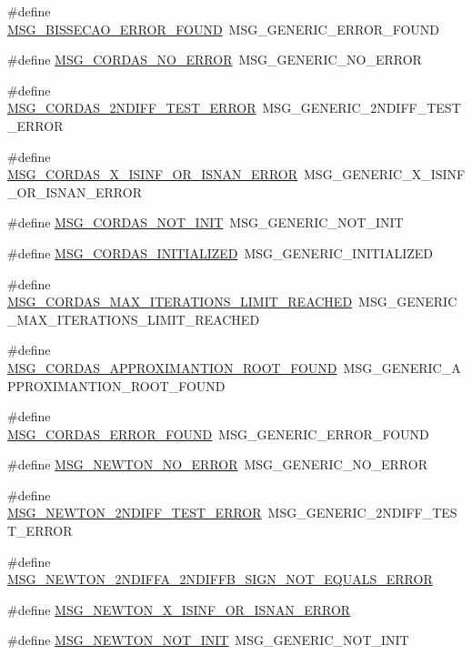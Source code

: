 \begin{CompactItemize}
\item 
\#define \hyperlink{group____messages_g045864209c190bf6517acac3482a4eeb}{MSG\_\-BISSECAO\_\-ERROR\_\-FOUND}~MSG\_\-GENERIC\_\-ERROR\_\-FOUND
\item 
\#define \hyperlink{group____messages_ge43ef9f2448a816d8f5a66a10be9ecc6}{MSG\_\-CORDAS\_\-NO\_\-ERROR}~MSG\_\-GENERIC\_\-NO\_\-ERROR
\item 
\#define \hyperlink{group____messages_g5c53fb596fa16a011c11b5f774fc734c}{MSG\_\-CORDAS\_\-2NDIFF\_\-TEST\_\-ERROR}~MSG\_\-GENERIC\_\-2NDIFF\_\-TEST\_\-ERROR
\item 
\#define \hyperlink{group____messages_g3833ee2af65442ebe52a0b8894d0ffba}{MSG\_\-CORDAS\_\-X\_\-ISINF\_\-OR\_\-ISNAN\_\-ERROR}~MSG\_\-GENERIC\_\-X\_\-ISINF\_\-OR\_\-ISNAN\_\-ERROR
\item 
\#define \hyperlink{group____messages_gaad95696ca51302bb4eeda73e504af28}{MSG\_\-CORDAS\_\-NOT\_\-INIT}~MSG\_\-GENERIC\_\-NOT\_\-INIT
\item 
\#define \hyperlink{group____messages_g65513cb1fdadbdf469b3e7ebfd3368fd}{MSG\_\-CORDAS\_\-INITIALIZED}~MSG\_\-GENERIC\_\-INITIALIZED
\item 
\#define \hyperlink{group____messages_gbf2eaacf66da6f1a3ff81d41a6d494ea}{MSG\_\-CORDAS\_\-MAX\_\-ITERATIONS\_\-LIMIT\_\-REACHED}~MSG\_\-GENERIC\_\-MAX\_\-ITERATIONS\_\-LIMIT\_\-REACHED
\item 
\#define \hyperlink{group____messages_g3ec8f3193397bc6bd52fa50ee40e4768}{MSG\_\-CORDAS\_\-APPROXIMANTION\_\-ROOT\_\-FOUND}~MSG\_\-GENERIC\_\-APPROXIMANTION\_\-ROOT\_\-FOUND
\item 
\#define \hyperlink{group____messages_gdceb3235c5e378df5e9204c5bd9802b9}{MSG\_\-CORDAS\_\-ERROR\_\-FOUND}~MSG\_\-GENERIC\_\-ERROR\_\-FOUND
\item 
\#define \hyperlink{group____messages_g40705a83db640354a9ed6bdd2ae0d83b}{MSG\_\-NEWTON\_\-NO\_\-ERROR}~MSG\_\-GENERIC\_\-NO\_\-ERROR
\item 
\#define \hyperlink{group____messages_g7f96c9da7fd5cde69744cd01fc5316a3}{MSG\_\-NEWTON\_\-2NDIFF\_\-TEST\_\-ERROR}~MSG\_\-GENERIC\_\-2NDIFF\_\-TEST\_\-ERROR
\item 
\#define \hyperlink{group____messages_g00fe718729c6efcf4a3bf8187b8f1c9d}{MSG\_\-NEWTON\_\-2NDIFFA\_\-2NDIFFB\_\-SIGN\_\-NOT\_\-EQUALS\_\-ERROR}
\item 
\#define \hyperlink{group____messages_g2e4a5cee2ec2eb38f4849592b3a5c126}{MSG\_\-NEWTON\_\-X\_\-ISINF\_\-OR\_\-ISNAN\_\-ERROR}
\item 
\#define \hyperlink{group____messages_ga1b4ab745166b225744424592a99ac26}{MSG\_\-NEWTON\_\-NOT\_\-INIT}~MSG\_\-GENERIC\_\-NOT\_\-INIT

\end{CompactItemize}
